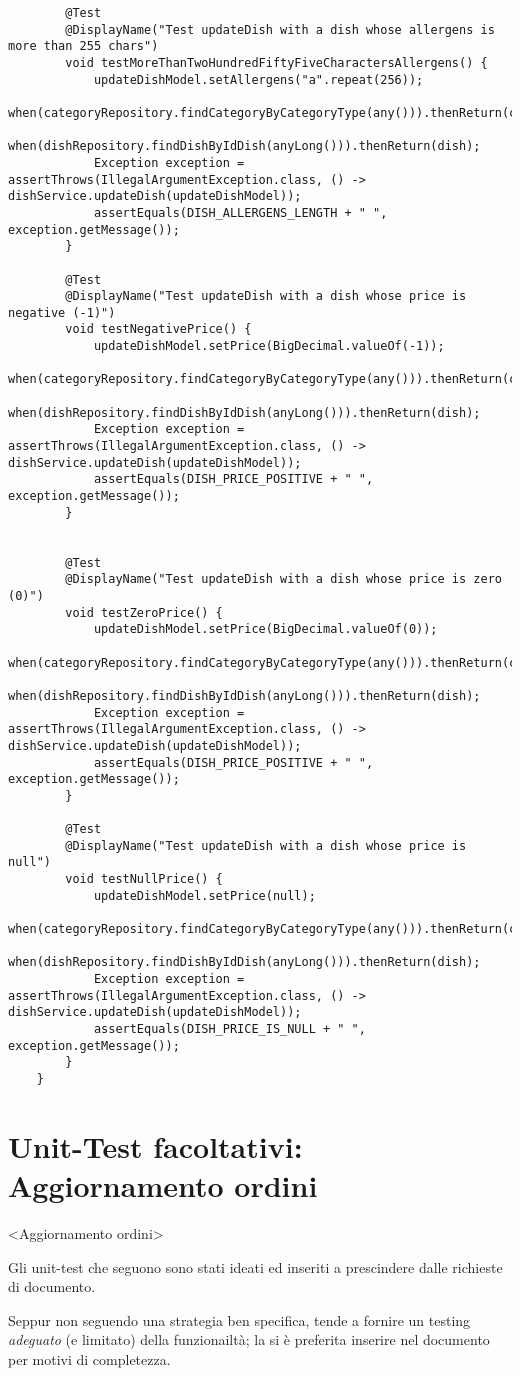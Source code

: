 \begin{verbatim}
		@Test
		@DisplayName("Test updateDish with a dish whose allergens is more than 255 chars")
		void testMoreThanTwoHundredFiftyFiveCharactersAllergens() {
			updateDishModel.setAllergens("a".repeat(256));
			when(categoryRepository.findCategoryByCategoryType(any())).thenReturn(category);
			when(dishRepository.findDishByIdDish(anyLong())).thenReturn(dish);
			Exception exception = assertThrows(IllegalArgumentException.class, () -> dishService.updateDish(updateDishModel));
			assertEquals(DISH_ALLERGENS_LENGTH + " ", exception.getMessage());
		}

		@Test
		@DisplayName("Test updateDish with a dish whose price is negative (-1)")
		void testNegativePrice() {
			updateDishModel.setPrice(BigDecimal.valueOf(-1));
			when(categoryRepository.findCategoryByCategoryType(any())).thenReturn(category);
			when(dishRepository.findDishByIdDish(anyLong())).thenReturn(dish);
			Exception exception = assertThrows(IllegalArgumentException.class, () -> dishService.updateDish(updateDishModel));
			assertEquals(DISH_PRICE_POSITIVE + " ", exception.getMessage());
		}


		@Test
		@DisplayName("Test updateDish with a dish whose price is zero (0)")
		void testZeroPrice() {
			updateDishModel.setPrice(BigDecimal.valueOf(0));
			when(categoryRepository.findCategoryByCategoryType(any())).thenReturn(category);
			when(dishRepository.findDishByIdDish(anyLong())).thenReturn(dish);
			Exception exception = assertThrows(IllegalArgumentException.class, () -> dishService.updateDish(updateDishModel));
			assertEquals(DISH_PRICE_POSITIVE + " ", exception.getMessage());
		}

		@Test
		@DisplayName("Test updateDish with a dish whose price is null")
		void testNullPrice() {
			updateDishModel.setPrice(null);
			when(categoryRepository.findCategoryByCategoryType(any())).thenReturn(category);
			when(dishRepository.findDishByIdDish(anyLong())).thenReturn(dish);
			Exception exception = assertThrows(IllegalArgumentException.class, () -> dishService.updateDish(updateDishModel));
			assertEquals(DISH_PRICE_IS_NULL + " ", exception.getMessage());
		}
	}
\end{verbatim}

\section{Unit-Test facoltativi: Aggiornamento ordini}<Aggiornamento ordini>
\begin{info}
	Gli unit-test che seguono sono stati ideati ed inseriti a prescindere
	dalle richieste di documento.
	\par\vspace{3mm}
	Seppur non seguendo una strategia ben specifica, 
	tende a fornire un testing \textit{adeguato} (e limitato)
	della funzionailtà; la si è preferita inserire nel documento
	per motivi di completezza.
\end{info}

